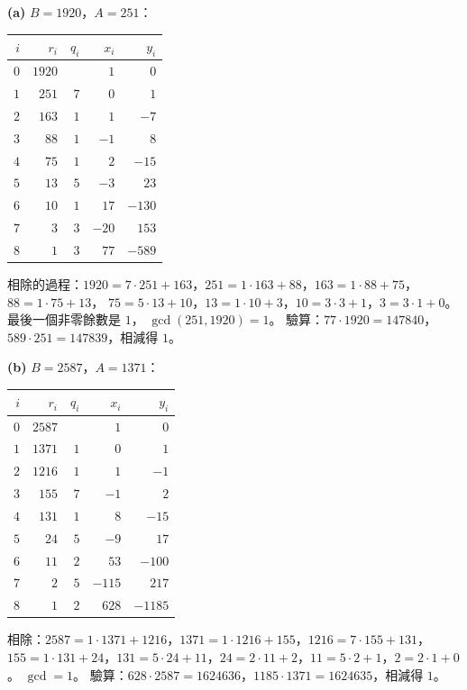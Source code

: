 \begin{pastsoln}
\textbf{(a)} $B = 1920$，$A = 251$：
\begin{center}
\begin{tabular}{rrrrr}
\toprule
$i$ & $r_i$ & $q_i$ & $x_i$ & $y_i$ \\
\midrule
$0$ & $1920$ & & $1$ & $0$ \\
$1$ & $251$ & $7$ & $0$ & $1$ \\
$2$ & $163$ & $1$ & $1$ & $-7$ \\
$3$ & $88$ & $1$ & $-1$ & $8$ \\
$4$ & $75$ & $1$ & $2$ & $-15$ \\
$5$ & $13$ & $5$ & $-3$ & $23$ \\
$6$ & $10$ & $1$ & $17$ & $-130$ \\
$7$ & $3$ & $3$ & $-20$ & $153$ \\
$8$ & $1$ & $3$ & $77$ & $-589$ \\
\bottomrule
\end{tabular}
\end{center}
相除的過程：$1920 = 7 \cdot 251 + 163$，$251 = 1 \cdot 163 + 88$，$163 = 1 \cdot 88 + 75$，$88 = 1 \cdot 75 + 13$，
$75 = 5 \cdot 13 + 10$，$13 = 1 \cdot 10 + 3$，$10 = 3 \cdot 3 + 1$，$3 = 3 \cdot 1 + 0$。 最後一個非零餘數是 $1$，
$\gcd(251, 1920) = 1$。 驗算：$77 \cdot 1920 = 147840$，$589 \cdot 251 = 147839$，相減得 $1$。

\textbf{(b)} $B = 2587$，$A = 1371$：
\begin{center}
\begin{tabular}{rrrrr}
\toprule
$i$ & $r_i$ & $q_i$ & $x_i$ & $y_i$ \\
\midrule
$0$ & $2587$ & & $1$ & $0$ \\
$1$ & $1371$ & $1$ & $0$ & $1$ \\
$2$ & $1216$ & $1$ & $1$ & $-1$ \\
$3$ & $155$ & $7$ & $-1$ & $2$ \\
$4$ & $131$ & $1$ & $8$ & $-15$ \\
$5$ & $24$ & $5$ & $-9$ & $17$ \\
$6$ & $11$ & $2$ & $53$ & $-100$ \\
$7$ & $2$ & $5$ & $-115$ & $217$ \\
$8$ & $1$ & $2$ & $628$ & $-1185$ \\
\bottomrule
\end{tabular}
\end{center}
相除：$2587 = 1 \cdot 1371 + 1216$，$1371 = 1 \cdot 1216 + 155$，$1216 = 7 \cdot 155 + 131$，
$155 = 1 \cdot 131 + 24$，$131 = 5 \cdot 24 + 11$，$24 = 2 \cdot 11 + 2$，$11 = 5 \cdot 2 + 1$，$2 = 2 \cdot 1 + 0$。
$\gcd = 1$。 驗算：$628 \cdot 2587 = 1624636$，$1185 \cdot 1371 = 1624635$，相減得 $1$。


\end{pastsoln}
